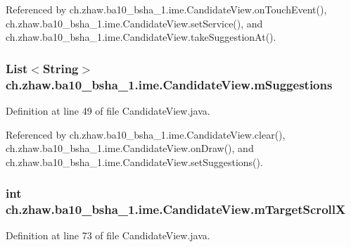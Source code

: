 Referenced by ch.zhaw.ba10\_\-bsha\_\-1.ime.CandidateView.onTouchEvent(), ch.zhaw.ba10\_\-bsha\_\-1.ime.CandidateView.setService(), and ch.zhaw.ba10\_\-bsha\_\-1.ime.CandidateView.takeSuggestionAt().\hypertarget{classch_1_1zhaw_1_1ba10__bsha__1_1_1ime_1_1CandidateView_a3e227667ae0295c1e7f36d55342bc8bd}{
\subsubsection[{mSuggestions}]{\setlength{\rightskip}{0pt plus 5cm}List$<$String$>$ {\bf ch.zhaw.ba10\_\-bsha\_\-1.ime.CandidateView.mSuggestions}}}
\label{classch_1_1zhaw_1_1ba10__bsha__1_1_1ime_1_1CandidateView_a3e227667ae0295c1e7f36d55342bc8bd}


Definition at line 49 of file CandidateView.java.

Referenced by ch.zhaw.ba10\_\-bsha\_\-1.ime.CandidateView.clear(), ch.zhaw.ba10\_\-bsha\_\-1.ime.CandidateView.onDraw(), and ch.zhaw.ba10\_\-bsha\_\-1.ime.CandidateView.setSuggestions().\hypertarget{classch_1_1zhaw_1_1ba10__bsha__1_1_1ime_1_1CandidateView_a9ed80c188a223426cd2d8577f599ae35}{
\subsubsection[{mTargetScrollX}]{\setlength{\rightskip}{0pt plus 5cm}int {\bf ch.zhaw.ba10\_\-bsha\_\-1.ime.CandidateView.mTargetScrollX}}}
\label{classch_1_1zhaw_1_1ba10__bsha__1_1_1ime_1_1CandidateView_a9ed80c188a223426cd2d8577f599ae35}


Definition at line 73 of file CandidateView.java.


